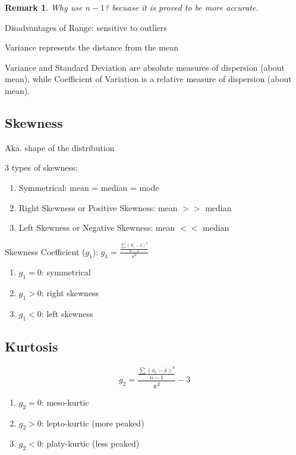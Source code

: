 \documentclass[12pt,a4paper]{article}
\newtheorem*{rem}{Remark}
\newcommand{\Remark}[1]{
  \begin{rem}
    \color{cyan}
    #1
  \end{rem}
}
\begin{document}
\Remark{Why use $n-1$? becuase it is proved to be more accurate.}

Disadvantages of Range: sensitive to outliers

Variance represents the distance from the mean

Variance and Standard Deviation are absolute measures of dispersion (about mean),
while Coefficient of Variation is a relative measure of dispersion (about mean).

\subsection*{Skewness}

Aka. shape of the distribution

3 types of skewness:

\begin{enumerate}
    \item Symmetrical: mean = median = mode
    \item Right Skewness or Positive Skewness: mean $>>$ median
    \item Left Skewness or Negative Skewness: mean $<<$ median
\end{enumerate}

Skewness Coefficient ($g_1$): $g_1 = \frac{\frac{\sum (X_i - \bar{x})^3}{n-1}}{s^3}$

\begin{enumerate}
    \item $g_1 = 0$: symmetrical 
    \item $g_1 > 0$: right skewness
    \item $g_1 < 0$: left skewness
\end{enumerate}

\subsection*{Kurtosis}

\[ g_2 = \frac{\frac{\sum(x_i - \bar{x})^4}{n-1}}{s^4} - 3\]

\begin{enumerate}
    \item $g_2 = 0$: meso-kurtic
    \item $g_2 > 0$: lepto-kurtic (more peaked)
    \item $g_2 < 0$: platy-kurtic (less peaked)
\end{enumerate}
\end{document}
